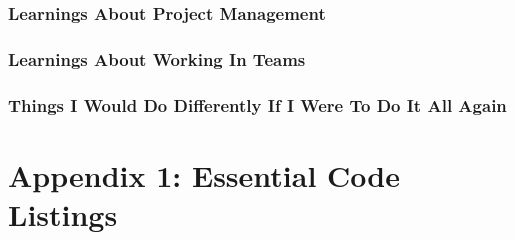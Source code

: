 \documentclass[onecolumn, draftclsnofoot,10pt, compsoc]{IEEEtran}
\begin{document}
\subsubsection{Learnings About Project Management}




\subsubsection{Learnings About Working In Teams}




\subsubsection{Things I Would Do Differently If I Were To Do It All Again}






\section{Appendix 1: Essential Code Listings}









	
	
\end{document}
